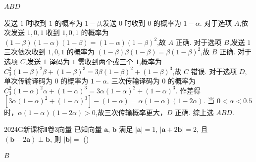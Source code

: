 \documentclass[12pt,UTF-8,a4paper]{ctexart}
\numberwithin{figure}{section}
\theoremstyle{mystyle}
\theoremstyle{mystylekaishu}
\theoremstyle{mystyle}
\numberwithin{xiti}{section}
\begin{document}
\begin{answer}
$ABD$
\end{answer}

\begin{solutions}
发送 $1$ 时收到 $1$ 的概率为 $1-\beta$,发送 $0$ 时收到 $0$ 的概率为 $1-\alpha$.
对于选项 $A$,依次发送 $1,0,1$ 收到 $1,0,1$ 的概率为 $(1-\beta)(1-\alpha)(1-\beta)=(1-\alpha)(1-\beta)^{2}$,故 $A$ 正确.
对于选项 $B$,发送 $1$ 三次依次收到 $1,0,1$ 的概率为 $(1-\beta)\beta(1-\beta)=\beta(1-\beta)^{2}$,故 $B$ 正确.
对于选项 $C$,发送 $1$ 译码为 $1$ 需收到两个或三个 $1$,概率为 $C_{3}^{2}(1-\beta)^{2}\beta+(1-\beta)^{3}=3\beta(1-\beta)^{2}+(1-\beta)^{3}$,故 $C$ 错误.
对于选项 $D$,单次传输译码为 $0$ 的概率为 $1-\alpha$. 三次传输译码为 $0$ 的概率为 $C_{3}^{2}(1-\alpha)^{2}\alpha+(1-\alpha)^{3}=3\alpha(1-\alpha)^{2}+(1-\alpha)^{3}$.
作差得 $[3\alpha(1-\alpha)^{2}+(1-\alpha)^{3}]-(1-\alpha)=\alpha(1-\alpha)(1-2\alpha)$.
当 $0<\alpha<0.5$ 时，$\alpha(1-\alpha)(1-2\alpha)>0$,故三次传输概率更大，$D$ 正确.
综上选 $ABD$.
\end{solutions}


\begin{problem}{2024}{G}{新课标Ⅱ卷}{3}{向量}
已知向量 $\boldsymbol{a}$, $\boldsymbol{b}$ 满足 $|\boldsymbol{a}|=1$, $|\boldsymbol{a}+2\boldsymbol{b}|=2$, 且 $(\boldsymbol{b}-2\boldsymbol{a}) \perp \boldsymbol{b}$, 则 $|\boldsymbol{b}|=$ (\hspace{1cm})
\begin{choices}
\end{choices}
\end{problem}

\begin{answer}
$B$
\end{answer}
\end{document}
